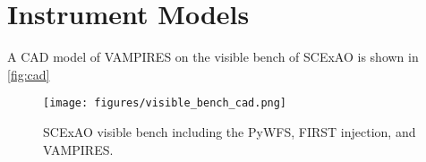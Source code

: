\section{Instrument Models\label{sec:models}}

A CAD model of VAMPIRES on the visible bench of SCExAO is shown in \autoref{fig:cad}


\begin{figure*}
    \centering
    \texttt{[image: figures/visible\_bench\_cad.png]}
    \caption{SCExAO visible bench including the PyWFS, FIRST injection, and VAMPIRES.\label{fig:cad}}
\end{figure*}
